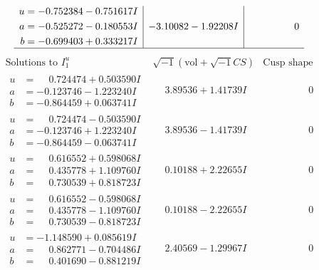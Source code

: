 \documentclass[1p]{elsarticle_modified}
\theoremstyle{definition}
\newcommand{\I}{\sqrt{-1}}
\begin{document}
$$\begin{array}{c|c|c}
\begin{aligned}
u &= -0.752384 - 0.751617 I \\
a &= -0.525272 - 0.180553 I \\
b &= -0.699403 + 0.333217 I\end{aligned}
 & -3.10082 - 1.92208 I & \phantom{-0.000000 } 0\\
 \hline 
 \end{array}$$\newpage$$\begin{array}{c|c|c}  
\text{Solutions to }I^u_{1}& \I (\text{vol} + \sqrt{-1}CS) & \text{Cusp shape}\\
 \hline 
\begin{aligned}
u &= \phantom{-}0.724474 + 0.503590 I \\
a &= -0.123746 - 1.223240 I \\
b &= -0.864459 + 0.063741 I\end{aligned}
 & \phantom{-}3.89536 + 1.41739 I & \phantom{-0.000000 } 0 \\ \hline\begin{aligned}
u &= \phantom{-}0.724474 - 0.503590 I \\
a &= -0.123746 + 1.223240 I \\
b &= -0.864459 - 0.063741 I\end{aligned}
 & \phantom{-}3.89536 - 1.41739 I & \phantom{-0.000000 } 0 \\ \hline\begin{aligned}
u &= \phantom{-}0.616552 + 0.598068 I \\
a &= \phantom{-}0.435778 + 1.109760 I \\
b &= \phantom{-}0.730539 + 0.818723 I\end{aligned}
 & \phantom{-}0.10188 + 2.22655 I & \phantom{-0.000000 } 0 \\ \hline\begin{aligned}
u &= \phantom{-}0.616552 - 0.598068 I \\
a &= \phantom{-}0.435778 - 1.109760 I \\
b &= \phantom{-}0.730539 - 0.818723 I\end{aligned}
 & \phantom{-}0.10188 - 2.22655 I & \phantom{-0.000000 } 0 \\ \hline\begin{aligned}
u &= -1.148590 + 0.085619 I \\
a &= \phantom{-}0.862771 - 0.704486 I \\
b &= \phantom{-}0.401690 - 0.881219 I\end{aligned}
 & \phantom{-}2.40569 - 1.29967 I & \phantom{-0.000000 } 0 \\ \hline\begin{aligned}

\end{aligned}
\end{array}$$
\end{document}
